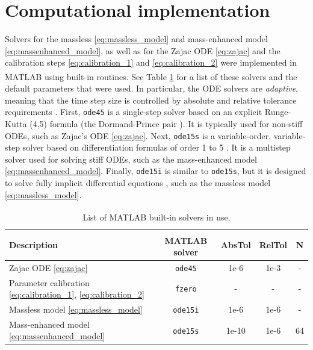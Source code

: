 \documentclass{sfuthesis}
\numberwithin{equation}{section}
\numberwithin{figure}{chapter}
\numberwithin{table}{chapter}
\theoremstyle{definition}
\newcommand{\matlab}{MATLAB\textsuperscript{\textcopyright} }
\begin{document}
\section{Computational implementation}

Solvers for the massless \eqref{eq:massless_model} and mass-enhanced model \eqref{eq:massenhanced_model}, as well as for the Zajac ODE \eqref{eq:zajac} and the calibration steps \eqref{eq:calibration_1} and \eqref{eq:calibration_2} were implemented in \matlab using built-in routines. See Table \ref{tab:matlab_solvers} for a list of these solvers and the default parameters that were used. In particular, the ODE solvers are \textit{adaptive}, meaning that the time step size is controlled by absolute and relative tolerance requirements \cite{ShampineReichelt1997}. First, \texttt{ode45} is a single-step solver based on an explicit Runge-Kutta (4,5) formula (the Dormand-Prince pair \cite{DormandPrince1980}). It is typically used for non-stiff ODEs, such as Zajac's ODE \eqref{eq:zajac}. Next, \texttt{ode15s} is a variable-order, variable-step solver based on differentiation formulas of order 1 to 5 \cite{ShampineReichelt1997}. It is a multistep solver used for solving stiff ODEs, such as the mass-enhanced model \eqref{eq:massenhanced_model}. Finally, \texttt{ode15i} is similar to \texttt{ode15s}, but it is designed to solve fully implicit differential equations \cite{Shampine2002}, such as the massless model \eqref{eq:massless_model}.


\begin{table}
    \centering
    \begin{tabular}{|l|c|c|c|c|}\hline
        Description & \matlab solver & AbsTol & RelTol & N \\\hline
        Zajac ODE \eqref{eq:zajac} & \texttt{ode45} & 1e-6 & 1e-3 & - \\\hline
        Parameter calibration \eqref{eq:calibration_1}, \eqref{eq:calibration_2} & \texttt{fzero} & - & - & - \\\hline
        Massless model \eqref{eq:massless_model} & \texttt{ode15i} & 1e-6 & 1e-6 & - \\\hline
        Mass-enhanced model \eqref{eq:massenhanced_model} & \texttt{ode15s} & 1e-10 & 1e-6 & 64 \\\hline
    \end{tabular}
    \caption{List of \matlab built-in solvers in use.}
    \label{tab:matlab_solvers}
\end{table}
\end{document}
